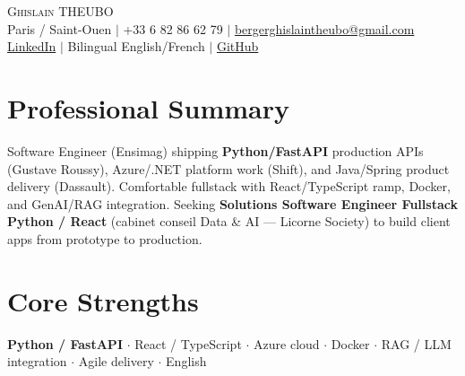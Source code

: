 \documentclass[letterpaper,10.5pt]{article}
\begin{document}
\begin{center}
{\Huge \scshape Ghislain THEUBO} \\ \vspace{2pt}
\small Paris / Saint-Ouen $|$ +33 6 82 86 62 79 $|$ \href{mailto:bergerghislaintheubo@gmail.com}{bergerghislaintheubo@gmail.com} \\
\href{https://www.linkedin.com/in/berger-ghislain}{LinkedIn} $|$ Bilingual English/French $|$ \href{https://github.com/Bergerghislain}{GitHub}
\end{center}
\vspace{-6pt}
\section{Professional Summary}
\small{Software Engineer (Ensimag) shipping \textbf{Python/FastAPI} production APIs (Gustave Roussy), Azure/.NET platform work (Shift), and Java/Spring product delivery (Dassault). Comfortable fullstack with React/TypeScript ramp, Docker, and GenAI/RAG integration. Seeking \textbf{Solutions Software Engineer Fullstack Python / React} (cabinet conseil Data \& AI --- Licorne Society) to build client apps from prototype to production.}
\section{Core Strengths}
\small{\textbf{Python / FastAPI} $\cdot$ React / TypeScript $\cdot$ Azure cloud $\cdot$ Docker $\cdot$ RAG / LLM integration $\cdot$ Agile delivery $\cdot$ English}
\end{document}
